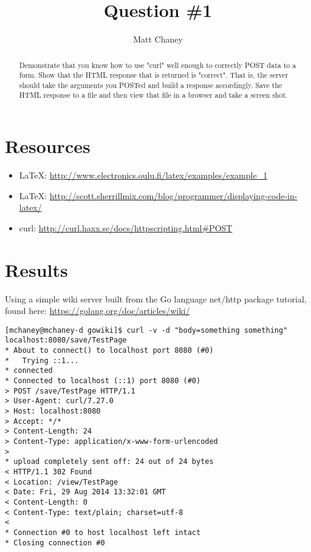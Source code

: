 \documentclass[10pt,letterpaper]{article}
\begin{document}
\lstset{language=Python, basicstyle=\small}

\title{Question \#1}
\author{Matt Chaney}

\maketitle

\begin{abstract}
Demonstrate that you know how to use "curl" well enough to 
correctly POST data to a form.  Show that the HTML response that
is returned is "correct".  That is, the server should take the
arguments you POSTed and build a response accordingly.  Save the
HTML response to a file and then view that file in a browser and
take a screen shot.
\end{abstract}

\section{Resources}
\begin{itemize}
\item \LaTeX: \url{http://www.electronics.oulu.fi/latex/examples/example_1}
\item \LaTeX: \url{http://scott.sherrillmix.com/blog/programmer/displaying-code-in-latex/}
\item curl: \url{http://curl.haxx.se/docs/httpscripting.html#POST}
\end{itemize}

\section{Results}
Using a simple wiki server built from the Go language net/http package tutorial, found here: \url{https://golang.org/doc/articles/wiki/}
\begin{verbatim}
[mchaney@mchaney-d gowiki]$ curl -v -d "body=something something" localhost:8080/save/TestPage
* About to connect() to localhost port 8080 (#0)
*   Trying ::1...
* connected
* Connected to localhost (::1) port 8080 (#0)
> POST /save/TestPage HTTP/1.1
> User-Agent: curl/7.27.0
> Host: localhost:8080
> Accept: */*
> Content-Length: 24
> Content-Type: application/x-www-form-urlencoded
> 
* upload completely sent off: 24 out of 24 bytes
< HTTP/1.1 302 Found
< Location: /view/TestPage
< Date: Fri, 29 Aug 2014 13:32:01 GMT
< Content-Length: 0
< Content-Type: text/plain; charset=utf-8
< 
* Connection #0 to host localhost left intact
* Closing connection #0
\end{verbatim}
\end{document}
